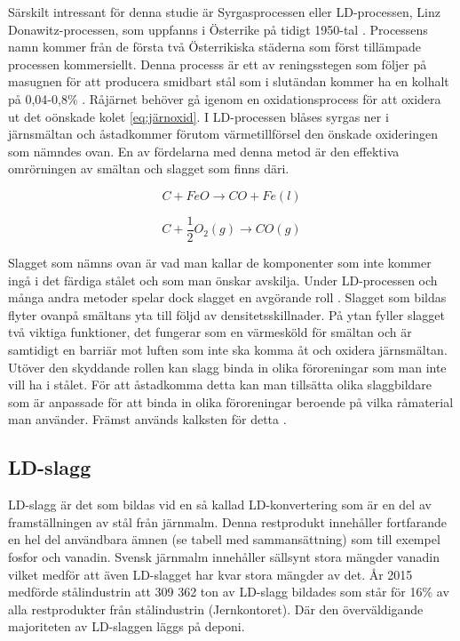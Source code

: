 Särskilt intressant för denna studie är Syrgasprocessen eller LD-processen, Linz Donawitz-processen, som uppfanns i Österrike på tidigt 1950-tal \cite{Jernkontoret2000del1}.
Processens namn kommer från de första två Österrikiska städerna som först tillämpade processen kommersiellt. Denna processs är ett av reningsstegen som följer på masugnen för att producera smidbart stål som i slutändan kommer ha en kolhalt på 0,04-0,8\% \cite{Jernkontoret2000del2}.
Råjärnet behöver gå igenom en oxidationsprocess för att oxidera ut det oönskade kolet \eqref{eq:järnoxid}.
I LD-processen blåses syrgas ner i järnsmältan och åstadkommer förutom värmetillförsel den önskade oxideringen som nämndes ovan. En av fördelarna med denna metod är den effektiva omrörningen av smältan och slagget som finns däri.

\begin{equation}
    C+FeO \rightarrow CO + Fe(l)
    \label{eq:järnoxid}
\end{equation}

\begin{equation}
    C +\frac{1}{2} O_{2}(g) \rightarrow CO(g)
    \label{eq:kolox}
\end{equation}

Slagget som nämns ovan är vad man kallar de komponenter som inte kommer ingå i det färdiga stålet och som man önskar avskilja. Under LD-processen och många andra metoder spelar dock slagget en avgörande roll  \cite{Slagg-Jernkontoret}. 
Slagget som bildas flyter ovanpå smältans yta till följd av densitetsskillnader. På ytan fyller slagget två viktiga funktioner, det fungerar som en värmesköld för smältan och är samtidigt en barriär mot luften som inte ska komma åt och oxidera järnsmältan. Utöver den skyddande rollen kan slagg binda in olika föroreningar som man inte vill ha i stålet. För att åstadkomma detta kan man tillsätta olika slaggbildare som är anpassade för att binda in olika föroreningar beroende på vilka råmaterial man använder. Främst används kalksten för detta \cite{RobertVikman}.

\subsection{LD-slagg}
LD-slagg är det som bildas vid en så kallad LD-konvertering som är en del av framställningen av stål från järnmalm. Denna restprodukt innehåller fortfarande en hel del användbara ämnen (se tabell med sammansättning) som till exempel fosfor och vanadin. Svensk järnmalm innehåller sällsynt stora mängder vanadin vilket medför att även LD-slagget har kvar stora mängder av det. År 2015 medförde stålindustrin att 309 362 ton av LD-slagg bildades som står för 16\% av alla restprodukter från stålindustrin (Jernkontoret). Där den överväldigande majoriteten av LD-slaggen läggs på deponi.

